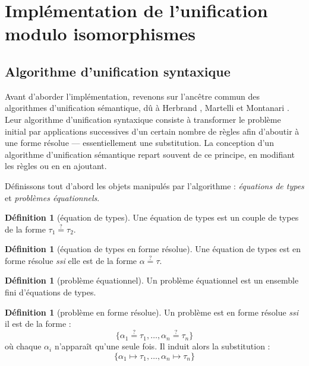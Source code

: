 \documentclass[a4paper]{report}
\theoremstyle{definition}
\newtheorem{definition}[theoreme]{Définition}
\newcommand{\qeq}{\stackrel {\scriptscriptstyle ?} =}
\newcommand{\ssi}{\textit{ssi}\xspace}
\begin{document}

\section{Implémentation de l'unification modulo isomorphismes}


\subsection{Algorithme d'unification syntaxique}

Avant d'aborder l'implémentation, revenons sur l'ancêtre commun des algorithmes d'unification sémantique, dû à Herbrand \cite{Herbrand}, Martelli et Montanari \cite{Martelli_Montanari}. Leur algorithme d'unification syntaxique consiste à transformer le problème initial par applications successives d'un certain nombre de règles afin d'aboutir à une forme résolue — essentiellement une substitution. La conception d'un algorithme d'unification sémantique repart souvent de ce principe, en modifiant les règles ou en en ajoutant.

Définissons tout d'abord les objets manipulés par l'algorithme : \emph{équations de types} et \emph{problèmes équationnels}.

\begin{definition}[équation de types]
	Une équation de types est un couple de types de la forme $\tau_1 \qeq \tau_2$.
\end{definition}

\begin{definition}[équation de types en forme résolue]
	Une équation de types est en forme résolue \ssi elle est de la forme $\alpha \qeq \tau$.
\end{definition}

\begin{definition}[problème équationnel]
	Un problème équationnel est un ensemble fini d'équations de types.
\end{definition}

\begin{definition}[problème en forme résolue]
	Un problème est en forme résolue \ssi il est de la forme :
	\[ \{ \alpha_1 \qeq \tau_1, \dots, \alpha_n \qeq \tau_n \} \]
	où chaque $\alpha_i$ n'apparaît qu'une seule fois. Il induit alors la substitution :
	\[ \{ \alpha_1 \mapsto \tau_1, \dots, \alpha_n \mapsto \tau_n \} \]
\end{definition}
\end{document}
